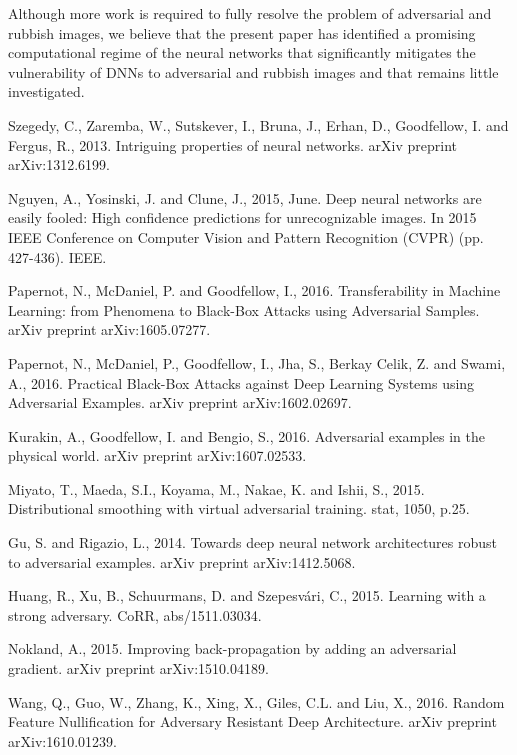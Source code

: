 \documentclass[12pt]{article} %
\begin{document}
Although more work is required to fully resolve the problem of adversarial and rubbish images, we believe that the present paper has identified a promising computational regime of the neural networks that significantly mitigates the vulnerability of DNNs to adversarial and rubbish images and that remains little investigated.



\begin{thebibliography}{99}
 Szegedy, C., Zaremba, W., Sutskever, I., Bruna, J., Erhan, D., Goodfellow, I. and Fergus, R., 2013. Intriguing properties of neural networks. arXiv preprint arXiv:1312.6199.

 Nguyen, A., Yosinski, J. and Clune, J., 2015, June. Deep neural networks are easily fooled: High confidence predictions for unrecognizable images. In 2015 IEEE Conference on Computer Vision and Pattern Recognition (CVPR) (pp. 427-436). IEEE.

Papernot, N., McDaniel, P. and Goodfellow, I., 2016. Transferability in Machine Learning: from Phenomena to Black-Box Attacks using Adversarial Samples. arXiv preprint arXiv:1605.07277.

 Papernot, N., McDaniel, P., Goodfellow, I., Jha, S., Berkay Celik, Z. and Swami, A., 2016. Practical Black-Box Attacks against Deep Learning Systems using Adversarial Examples. arXiv preprint arXiv:1602.02697.

 Kurakin, A., Goodfellow, I. and Bengio, S., 2016. Adversarial examples in the physical world. arXiv preprint arXiv:1607.02533.

 Miyato, T., Maeda, S.I., Koyama, M., Nakae, K. and Ishii, S., 2015. Distributional smoothing with virtual adversarial training. stat, 1050, p.25.

 Gu, S. and Rigazio, L., 2014. Towards deep neural network architectures robust to adversarial examples. arXiv preprint arXiv:1412.5068.

 Huang, R., Xu, B., Schuurmans, D. and Szepesvári, C., 2015. Learning with a strong adversary. CoRR, abs/1511.03034.

 Nokland, A., 2015. Improving back-propagation by adding an adversarial gradient. arXiv preprint arXiv:1510.04189.

 Wang, Q., Guo, W., Zhang, K., Xing, X., Giles, C.L. and Liu, X., 2016. Random Feature Nullification for Adversary Resistant Deep Architecture. arXiv preprint arXiv:1610.01239.



\end{thebibliography}
\end{document}
